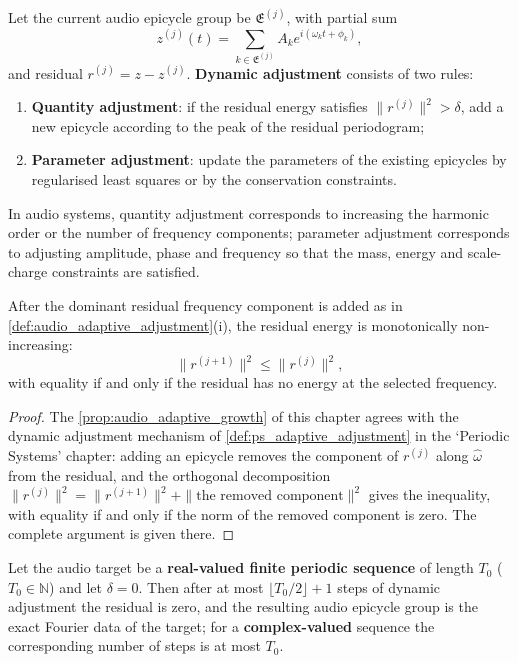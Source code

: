 \begin{definition}\label{def:audio_adaptive_adjustment}
Let the current audio epicycle group be $\mathfrak E^{(j)}$, with partial sum
\[
z^{(j)}(t)=\sum_{k\in\mathfrak E^{(j)}}A_k e^{i(\omega_k t+\phi_k)},
\]
and residual $r^{(j)}=z-z^{(j)}$. \textbf{Dynamic adjustment} consists of two rules:
\begin{enumerate}[label=(\roman*)]
    \item \textbf{Quantity adjustment}: if the residual energy satisfies $\|r^{(j)}\|^2>\delta$, add a new epicycle according to the peak of the residual periodogram;
    \item \textbf{Parameter adjustment}: update the parameters of the existing epicycles by regularised least squares or by the conservation constraints.
\end{enumerate}
In audio systems, quantity adjustment corresponds to increasing the harmonic order or the number of frequency components; parameter adjustment corresponds to adjusting amplitude, phase and frequency so that the mass, energy and scale-charge constraints are satisfied.
\end{definition}

\begin{proposition}\label{prop:audio_adaptive_growth}
After the dominant residual frequency component is added as in \cref{def:audio_adaptive_adjustment}(i), the residual energy is monotonically non-increasing:
\[
\|r^{(j+1)}\|^2\le\|r^{(j)}\|^2,
\]
with equality if and only if the residual has no energy at the selected frequency.
\end{proposition}

\begin{proof}
The \cref{prop:audio_adaptive_growth} of this chapter agrees with the dynamic adjustment mechanism of \cref{def:ps_adaptive_adjustment} in the `Periodic Systems' chapter:
adding an epicycle removes the component of $r^{(j)}$ along $\hat\omega$ from the residual, and the orthogonal decomposition
$\|r^{(j)}\|^2=\|r^{(j+1)}\|^2+\|\text{the removed component}\|^2$ gives the inequality,
with equality if and only if the norm of the removed component is zero. The complete argument is given there.
\end{proof}

\begin{theorem}\label{thm:audio_adaptive_convergence}
Let the audio target be a \textbf{real-valued finite periodic sequence} of length $T_0$ ($T_0\in\mathbb N$) and let $\delta=0$. Then after at most $\lfloor T_0/2\rfloor+1$ steps of dynamic adjustment the residual is zero, and the resulting audio epicycle group is the exact Fourier data of the target; for a \textbf{complex-valued} sequence the corresponding number of steps is at most $T_0$.
\end{theorem}

